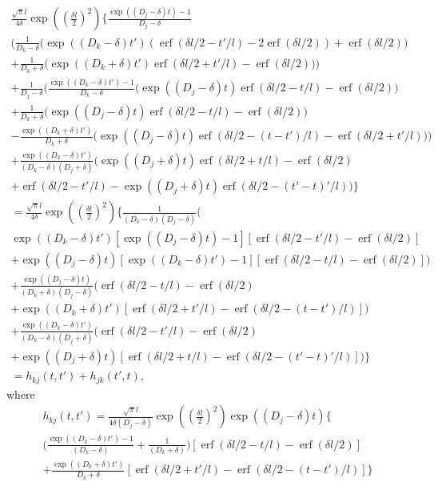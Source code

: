 \documentclass[a4paper]{article}
\newcommand{\erf}{\operatorname{erf}}
\begin{document}
\begin{multline}
  \frac{\sqrt{\pi}l}{4\delta}\exp\left(\left(\frac{\delta l}{2}\right)^2\right)
  \bigg\{
  \frac{\exp((D_j-\delta) t) - 1}{D_j-\delta} \\
  \bigg(
  \frac{1}{D_k-\delta}
  \bigg(
  \exp((D_k-\delta)t') (\erf(\delta l/2 - t'/l) - 2\erf(\delta l/2))
  + \erf(\delta l/2) \bigg) \\
  + \frac{1}{D_k+\delta}
  \bigg(
  \exp((D_k+\delta)t') \erf(\delta l/2 + t'/l) - \erf(\delta l/2) \bigg)
  \bigg) \\
  +
  \frac{1}{D_j - \delta} \bigg(
  \frac{\exp((D_k-\delta) t') - 1}{D_k-\delta}
  \bigg(\exp((D_j-\delta) t) \erf(\delta l/2 - t/l) - \erf(\delta l/2)
  \bigg) \\
  +
  \frac{1}{D_k+\delta}
  \bigg(\exp((D_j-\delta) t) \erf(\delta l/2 - t/l) - \erf(\delta l/2)
  \bigg) \\
  - \frac{\exp((D_k+\delta)t')}{D_k+\delta} \bigg(
  \exp((D_j-\delta) t) \erf(\delta l/2 - (t-t')/l) - \erf(\delta l/2 +
  t'/l) 
  \bigg)
  \bigg) \\
  +
  \frac{\exp((D_k-\delta) t')}{(D_k-\delta)(D_j+\delta)}
  \bigg(
  \exp((D_j + \delta) t) \erf(\delta l/2 + t/l) - \erf(\delta l / 2) \\
  + \erf(\delta l / 2 - t'/l) - 
  \exp((D_j + \delta) t) \erf(\delta l / 2 - (t'-t)'/l)
  \bigg)
  \bigg\} \\
  = 
  \frac{\sqrt{\pi}l}{4\delta}\exp\left(\left(\frac{\delta l}{2}\right)^2\right)
  \bigg\{ 
  \frac{1}{(D_k-\delta)(D_j-\delta)} \bigg( \\
  \exp((D_k-\delta)t') [\exp((D_j-\delta) t) - 1]
  [\erf(\delta l/2 - t'/l) - \erf(\delta l/2) ]
  \\
  +
  \exp((D_j-\delta) t) [\exp((D_k-\delta) t') - 1]
  [\erf(\delta l/2 - t/l) - \erf(\delta l/2)]
  \bigg) \\
  +
  \frac{\exp((D_j-\delta) t)}{(D_k+\delta)(D_j-\delta)}
  \bigg(
  \erf(\delta l/2 - t/l) - \erf(\delta l/2)
  \\
  +
  \exp((D_k+\delta)t') [\erf(\delta l/2 + t'/l)
  - \erf(\delta l/2 - (t-t')/l)]
  \bigg) \\
  +
  \frac{\exp((D_k-\delta) t')}{(D_k-\delta)(D_j+\delta)}
  \bigg(
  \erf(\delta l / 2 - t'/l) - \erf(\delta l / 2) \\
  + 
  \exp((D_j + \delta) t) [\erf(\delta l/2 + t/l)  - 
  \erf(\delta l / 2 - (t'-t)'/l)]
  \bigg)
  \bigg\} \\
  = h_{kj}(t, t') + h_{jk}(t', t),
\end{multline}
where
\begin{multline}
  h_{kj}(t, t') = 
  \frac{\sqrt{\pi}l}{4\delta(D_j - \delta)}\exp\left(\left(\frac{\delta l}{2}\right)^2\right)
  \exp((D_j-\delta) t)
  \bigg\{ 
   \\
  \bigg(
  \frac{\exp((D_k-\delta) t') - 1}{(D_k-\delta)}
  +
  \frac{1}{(D_k+\delta)}
  \bigg)
  [\erf(\delta l/2 - t/l) - \erf(\delta l/2)]
  \\
  + \frac{\exp((D_k+\delta)t')}{D_k+\delta}
  [\erf(\delta l/2 + t'/l)
  - \erf(\delta l/2 - (t-t')/l)]
  \bigg\} \\
\end{multline}
\end{document}
